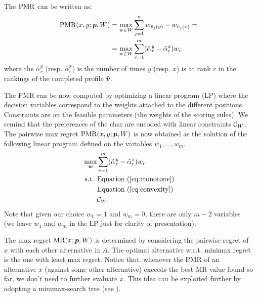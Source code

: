 \begin{claim}
The $\operatorname{PMR}$ can be written as:
\begin{align} 
\operatorname{PMR}(x,y; {\bm{p}}, W)  
& = \max_{w \in W} \sum_{j=1}^n w_{\hat{v}_j(y)} - w_{\hat{v}_j(x)} = \\ 
& = \max_{w \in W} \sum_{r=1}^m (\hat{\alpha}_{r}^{y} - \hat{\alpha}_{r}^{x}) w_i. 
\end{align}
where the $\hat{\alpha}_{r}^{y}$ (resp. $\hat{\alpha}_{r}^{x}$)  is the number of times $y$ (resp. $x$) is at rank $r$ in the rankings of the completed profile $\hat{\bm{v}}$.
\end{claim}
The PMR can be now computed by optimizing a linear program (LP) where the decision variables correspond to the weights attached to the different positions.
Constraints are on the feasible parameters (the weights of the scoring rules).
We remind that the preferences of the char are encoded with linear constraints $\mathcal{C}_{W}$.
The pairwise max regret $\operatorname{PMR}(x,y; {\bm{p}},W)$ is now obtained as the solution of the following linear program defined on the variables $w_1, …, w_m$. 
\begin{align*}
\max_{\bm{w}} & \sum_{r=1}^m (\hat{\alpha}_{r}^{y} - \hat{\alpha}_{r}^{x}) w_{r}\\
\text{ s.t. } & \text{Equation } (\ref{eq:monotone})\\
& \text{Equation } (\ref{eq:convexity})\\
& \mathcal{C}_W.
\end{align*}
Note that given our choice $w_{1}=1$ and $w_{m}=0$, there are only $m-2$ variables 
(we leave $w_{1}$ and $w_{m}$ in the LP just for clarity of presentation).

The max regret $\operatorname{MR}(x; {\bm{p}}, W)$ is determined by considering the pairwise regret of $x$ with each other alternative in $A$.
The optimal alternative w.r.t. minimax regret is the one with least max regret. 
Notice that, whenever the PMR of an alternative $x$ (against some other alternative) exceeds the best MR value found so far, we don't need to further evaluate $x$. 
This idea can be exploited further by adopting a minimax-search tree (see \cite{Braziunas2011}).

